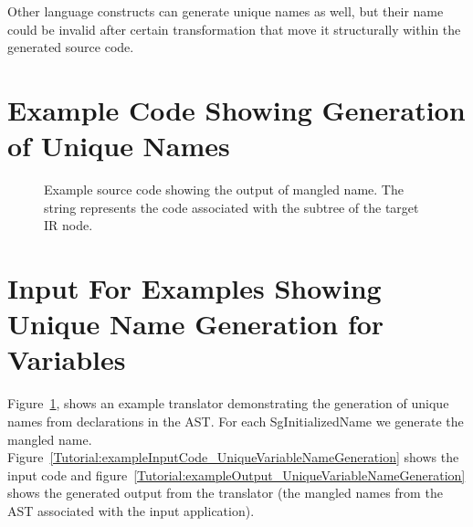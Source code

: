 Other language constructs can generate unique names as well, but their
name could be invalid after certain transformation that move it 
structurally within the generated source code.


\section{Example Code Showing Generation of Unique Names}

\begin{figure}[!h]
{\indent
{\mySmallFontSize

\begin{latexonly}
   
\end{latexonly}

\begin{htmlonly}
   
\end{htmlonly}

}
}
\caption{Example source code showing the output of mangled name. The string
         represents the code associated with the subtree of the target IR node.}
\label{Tutorial:uniqueNameGeneration}
\end{figure}


\section{Input For Examples Showing Unique Name Generation for Variables}

Figure~\ref{Tutorial:uniqueNameGeneration},
shows an example translator demonstrating the generation of unique names from 
declarations in the AST.  For each SgInitializedName we generate the
mangled name.  Figure~\ref{Tutorial:exampleInputCode_UniqueVariableNameGeneration} 
shows the input code and 
figure~\ref{Tutorial:exampleOutput_UniqueVariableNameGeneration}
shows the generated output from the translator (the mangled names from
the AST associated with the input application).

